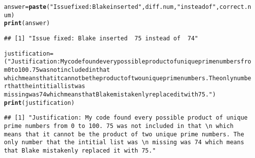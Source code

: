 \documentclass{article}\usepackage[]{graphicx}\usepackage[]{xcolor}
\makeatletter
\newcommand{\hlsng}[1]{\textcolor[rgb]{0.192,0.494,0.8}{#1}}%
\newcommand{\hldef}[1]{\textcolor[rgb]{0.345,0.345,0.345}{#1}}%
\newcommand{\hlkwb}[1]{\textcolor[rgb]{0.69,0.353,0.396}{#1}}%
\newcommand{\hlkwd}[1]{\textcolor[rgb]{0.737,0.353,0.396}{\textbf{#1}}}%
\newenvironment{kframe}{%
 \def\at@end@of@kframe{}%
 \ifinner\ifhmode%
  \def\at@end@of@kframe{\end{minipage}}%
  \begin{minipage}{\columnwidth}%
 \fi\fi%
 \def\FrameCommand##1{\hskip\@totalleftmargin \hskip-\fboxsep
 \colorbox{shadecolor}{##1}\hskip-\fboxsep
     \hskip-\linewidth \hskip-\@totalleftmargin \hskip\columnwidth}%
 \MakeFramed {\advance\hsize-\width
   \@totalleftmargin\z@ \linewidth\hsize
   \@setminipage}}%
 {\par\unskip\endMakeFramed%
 \at@end@of@kframe}
\newenvironment{knitrout}{}{} %
\makeatother
\begin{document}
\begin{enumerate}
\begin{knitrout}
\begin{kframe}
\begin{alltt}
\hldef{answer} \hlkwb{=} \hlkwd{paste}\hldef{(}\hlsng{"Issue fixed: Blake inserted "}\hldef{, diff.num,} \hlsng{"instead of "}\hldef{, correct.num)}
\hlkwd{print}\hldef{(answer)}
\end{alltt}
\begin{verbatim}
## [1] "Issue fixed: Blake inserted  75 instead of  74"
\end{verbatim}
\begin{alltt}
\hldef{justification} \hlkwb{=}
\hldef{(}\hlsng{"Justification: My code found every possible product of unique prime numbers from 0 to 100. 75 was not included in that 
 which means that it cannot be the product of two unique prime numbers. The only number that the intitial list was 
 missing was 74 which means that Blake mistakenly replaced it with 75."}\hldef{)}
\hlkwd{print}\hldef{(justification)}
\end{alltt}
\begin{verbatim}
## [1] "Justification: My code found every possible product of unique prime numbers from 0 to 100. 75 was not included in that \n which means that it cannot be the product of two unique prime numbers. The only number that the intitial list was \n missing was 74 which means that Blake mistakenly replaced it with 75."
\end{verbatim}
\end{kframe}
\end{knitrout}
\end{enumerate}


\end{document}
